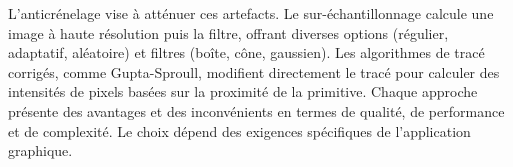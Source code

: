 \documentclass{article}
\begin{document}
L'anticrénelage vise à atténuer ces artefacts. Le sur-échantillonnage calcule une image à haute résolution puis la filtre, offrant diverses options (régulier, adaptatif, aléatoire) et filtres (boîte, cône, gaussien). Les algorithmes de tracé corrigés, comme Gupta-Sproull, modifient directement le tracé pour calculer des intensités de pixels basées sur la proximité de la primitive. Chaque approche présente des avantages et des inconvénients en termes de qualité, de performance et de complexité. Le choix dépend des exigences spécifiques de l'application graphique.
\end{document}
